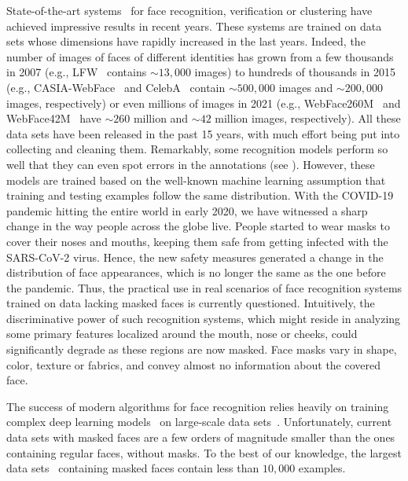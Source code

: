 \documentclass{article}
\begin{document}
State-of-the-art systems~\cite{Schroff15CVPR,Deng19CVPR,Parkhi15BMVC,Liu2017CVPR} for face recognition, verification or clustering have achieved impressive results in recent years. These systems are trained on data sets whose dimensions have rapidly increased in the last years. Indeed, the number of images of faces of different identities has grown from a few thousands in 2007 (e.g., LFW~\cite{Huang07Tech} contains $\sim\!13,000$ images) to hundreds of thousands in 2015 (e.g., CASIA-WebFace~\cite{yi2014learning} and CelebA~\cite{Liu2015ICCV} contain $\sim\!500,000$ images and $\sim\!200,000$ images, respectively) or even millions of images in 2021 (e.g., WebFace260M~\cite{Zhu2021CVPR} and WebFace42M~\cite{Zhu2021CVPR} have $\sim\!260$ million and $\sim\!42$ million images, respectively). All these data sets have been released in the past 15 years, with much effort being put into collecting and cleaning them. Remarkably, some recognition models perform so well that they can even spot errors in the annotations (see \cite{Schroff15CVPR}). However, these models are trained based on the well-known machine learning assumption that training and testing examples follow the same distribution. With the COVID-19 pandemic hitting the entire world in early 2020, we have witnessed a sharp change in the way people across the globe live. People started to wear masks to cover their noses and mouths, keeping them safe from getting infected with the SARS-CoV-2 virus. Hence, the new safety measures generated a change in the distribution of face appearances, which is no longer the same as the one before the pandemic. Thus, the practical use in real scenarios of face recognition systems trained on data lacking masked faces is currently questioned. Intuitively, the discriminative power of such recognition systems, which might reside in analyzing some primary features localized around the mouth, nose or cheeks, could significantly degrade as these regions are now masked. Face masks vary in shape, color, texture or fabrics, and convey almost no information about the covered face.

The success of modern algorithms for face recognition relies heavily on training complex deep learning models~\cite{Schroff15CVPR,Deng19CVPR,Liu2017CVPR} on large-scale data sets~\cite{Liu2017CVPR,yi2014learning,Liu2015ICCV}. Unfortunately, current data sets \cite{wang2020arxiv,anwar2020arxiv,deng2021arxiv,zhu2021arxiv} with masked faces are a few orders of magnitude smaller than the ones containing regular faces, without masks. To the best of our knowledge, the largest data sets~\cite{wang2020arxiv,deng2021arxiv} containing masked faces contain less than $10,000$ examples. 
\end{document}
